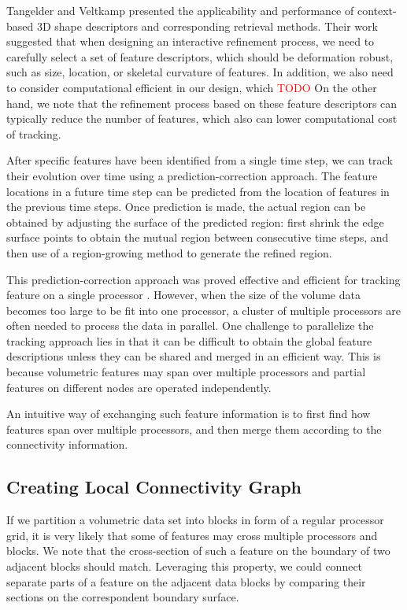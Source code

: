 \documentclass[10pt, conference, compsocconf]{IEEEtran}
\begin{document}
Tangelder and Veltkamp \cite{Schlemmer2007} presented the applicability and performance of context-based 3D shape descriptors and corresponding retrieval methods. Their work suggested that when designing an interactive refinement process, we need to carefully select a set of feature descriptors, which should be deformation robust, such as size, location, or skeletal curvature of features. In addition, we also need to consider computational efficient in our design, which \textcolor{red}{TODO}
On the other hand, we note that the refinement process based on these feature descriptors can typically reduce the number of features, which also can lower computational cost of tracking.

After specific features have been identified from a single time step, we can track their evolution over time using a prediction-correction approach. The feature locations in a future time step can be predicted from the location of features in the previous time steps. Once prediction is made, the actual region can be obtained by adjusting the surface of the predicted region: first shrink the edge surface points to obtain the mutual region between consecutive time steps, and then use of a region-growing method to generate the refined region.

This prediction-correction approach was proved effective and efficient for tracking feature on a single processor \cite{Muelder2009}. However, when the size of the volume data becomes too large to be fit into one processor, a cluster of multiple processors are often needed to process the data in parallel. One challenge to parallelize the tracking approach lies in that it can be difficult to obtain the global feature descriptions unless they can be shared and merged in an efficient way. This is because volumetric features may span over multiple processors and partial features on different nodes are operated independently.

An intuitive way of exchanging such feature information is to first find how features span over multiple processors, and then merge them according to the connectivity information.

\subsection{Creating Local Connectivity Graph}

If we partition a volumetric data set into blocks in form of a regular processor grid, it is very likely that some of features may cross multiple processors and blocks. We note that the cross-section of such a feature on the boundary of two adjacent blocks should match. Leveraging this property, we could connect separate parts of a feature on the adjacent data blocks by comparing their sections on the correspondent boundary surface.
\end{document}
